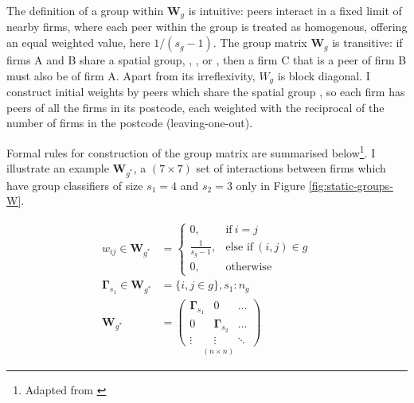 The definition of a group within $\mathbf W_g$ is intuitive:
peers interact in a fixed limit of nearby firms,
where each peer within the group is treated as homogenous, offering an equal weighted value,
here $1/(s_g-1)$.
The group matrix $\mathbf W_g$ is transitive: if firms A and B share a spatial group,
, , or ,
then a firm C that is a peer of firm B must also be of firm A.
Apart from its irreflexivity, $W_g$ is block diagonal.
I construct initial weights by peers which share the spatial group ,
so each firm has peers of all the firms in its postcode,
each weighted with the reciprocal of the number of firms in the postcode (leaving-one-out).
\par
Formal rules for construction of the group matrix are summarised
below\footnote{Adapted from \cite{Bramoulle2009}}.
I illustrate an example $\mathbf W_{g^*}$, a $(7\times 7)$ set of interactions
between firms which have group classifiers of size $s_1=4$ and $s_2=3$ only in Figure \ref{fig:static-groups-W}.

\begin{align*}
    w_{ij}\in \mathbf W_{g^*} &=
        \begin{cases}
            0,              & \text{if}         \ i=j           \\
            \frac1{s_g-1},  & \text{else if}    \ (i,j)\in g    \\
            0,              & \text{otherwise}
        \end{cases}
    \\
    \mathbf \Gamma_{s_1} \in \mathbf W_{g^*}
    &=
    \{ i, j \in g \}, s_1: n_g
    \\
    \mathbf W_{g^*}
    &=
    \underset{(n\times n)}{
        \begin{pmatrix}
            \mathbf \Gamma_{s_1}    &   0                       &   \dots       \\
            0                       &   \mathbf \Gamma_{s_2}    &   \dots       \\
            \vdots                  &   \vdots                  &   \ddots
        \end{pmatrix}
    }
\end{align*}

